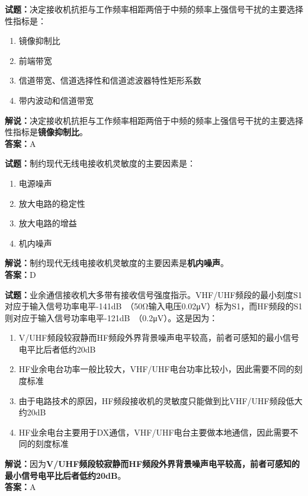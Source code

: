\documentclass{ctexbook}
\begin{document}
\vspace{1em}

\textbf{试题：}决定接收机抗拒与工作频率相距两倍于中频的频率上强信号干扰的主要选择性指标是：
\begin{enumerate}[leftmargin=3em]
  \item 镜像抑制比
  \item 前端带宽
  \item 信道带宽、信道选择性和信道滤波器特性矩形系数
  \item 带内波动和信道带宽
\end{enumerate}
\noindent\textbf{解说：}决定接收机抗拒与工作频率相距两倍于中频的频率上强信号干扰的主要选择性指标是\textbf{镜像抑制比}。\\\noindent\textbf{答案：}A

\vspace{1em}

\textbf{试题：}制约现代无线电接收机灵敏度的主要因素是：
\begin{enumerate}[leftmargin=3em]
  \item 电源噪声
  \item 放大电路的稳定性
  \item 放大电路的增益
  \item 机内噪声
\end{enumerate}
\noindent\textbf{解说：}制约现代无线电接收机灵敏度的主要因素是\textbf{机内噪声}。\\\noindent\textbf{答案：}D

\vspace{1em}

\textbf{试题：}业余通信接收机大多带有接收信号强度指示。VHF/UHF频段的最小刻度S1对应于输入信号功率电平-141\unit[qualifier-mode=combine]{\deci\bel{}}（50Ω输入电压0.02μV）标为S1，而HF频段的S1则对应于输入信号功率电平-121\unit[qualifier-mode=combine]{\deci\bel{}}（0.2μV）。这是因为：
\begin{enumerate}[leftmargin=3em]
  \item V/UHF频段较寂静而HF频段外界背景噪声电平较高，前者可感知的最小信号电平比后者低约20dB
  \item HF业余电台功率一般比较大，VHF/UHF电台功率比较小，因此需要不同的刻度标准
  \item 由于电路技术的原因，HF频段接收机的灵敏度只能做到比VHF/UHF频段低大约20dB
  \item HF业余电台主要用于DX通信，VHF/UHF电台主要做本地通信，因此需要不同的刻度标准
\end{enumerate}
\noindent\textbf{解说：}因为\textbf{V/UHF频段较寂静而HF频段外界背景噪声电平较高，前者可感知的最小信号电平比后者低约20dB}。\\\noindent\textbf{答案：}A
\end{document}

